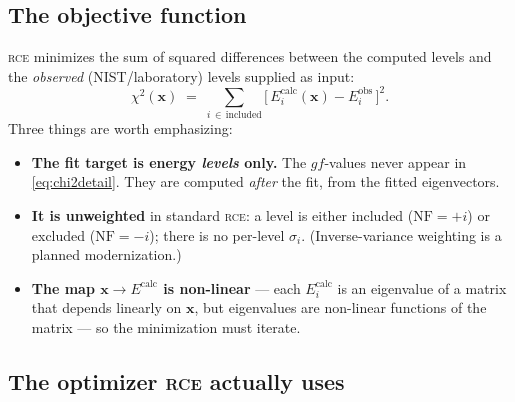 \documentclass[11pt]{article}
\newcommand{\prog}[1]{\textsc{#1}}
\begin{document}
\subsection{The objective function}

\prog{rce} minimizes the sum of squared differences between the computed levels
and the \emph{observed} (NIST/laboratory) levels supplied as input:
\begin{equation}
  \chi^2(\mathbf{x}) \;=\; \sum_{i\,\in\,\text{included}}
  \big[\, E_i^{\mathrm{calc}}(\mathbf{x}) - E_i^{\mathrm{obs}} \,\big]^2 .
  \label{eq:chi2detail}
\end{equation}
Three things are worth emphasizing:
\begin{itemize}[nosep]
\item \textbf{The fit target is energy \emph{levels} only.} The $gf$-values never
appear in \eqref{eq:chi2detail}. They are computed \emph{after} the fit, from the
fitted eigenvectors.
\item \textbf{It is unweighted} in standard \prog{rce}: a level is either included
($\mathrm{NF}=+i$) or excluded ($\mathrm{NF}=-i$); there is no per-level
$\sigma_i$. (Inverse-variance weighting is a planned modernization.)
\item \textbf{The map $\mathbf{x}\!\to\!E^{\mathrm{calc}}$ is non-linear} ---
each $E_i^{\mathrm{calc}}$ is an eigenvalue of a matrix that depends linearly on
$\mathbf{x}$, but eigenvalues are non-linear functions of the matrix --- so the
minimization must iterate.
\end{itemize}

\subsection{The optimizer \prog{rce} actually uses}
\end{document}
